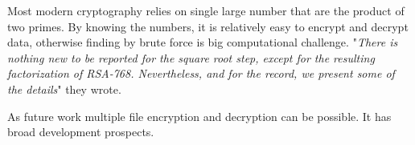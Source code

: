 \documentclass[conference]{IEEEtran}
\begin{document}
Most modern cryptography relies on single large number that are the product of two primes. By knowing the numbers, it is relatively easy to encrypt and decrypt data, otherwise finding by brute force is big computational challenge. "\emph{There is nothing new to be reported for the square root step, except for the resulting factorization of RSA-768. Nevertheless, and for the record, we present some of the details}"\cite{768_key} they wrote.


As future work multiple file encryption and decryption can be possible. It has broad development prospects. 

{

}



%



\end{document}
